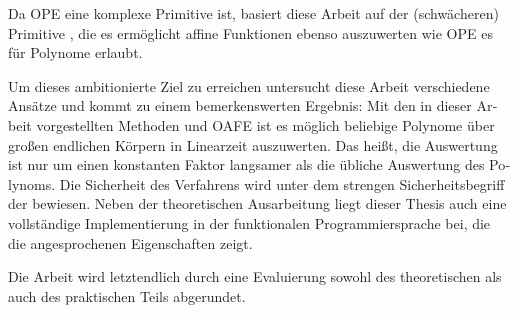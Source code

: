 \begin{otherlanguage}{ngerman}
Da OPE eine komplexe Primitive ist, basiert diese Arbeit auf der
(schwächeren) Primitive , die
es ermöglicht affine Funktionen ebenso auszuwerten wie OPE es für Polynome
erlaubt.

Um dieses ambitionierte Ziel zu erreichen untersucht diese Arbeit verschiedene
Ansätze und kommt zu einem bemerkenswerten Ergebnis: Mit den in dieser Arbeit
vorgestellten Methoden und OAFE ist es möglich beliebige Polynome über großen
endlichen Körpern in Linearzeit auszuwerten. Das heißt, die Auswertung ist nur
um einen konstanten Faktor langsamer als die übliche Auswertung des Polynoms.
Die Sicherheit des Verfahrens wird unter dem strengen Sicherheitsbegriff der
 \cite{canetti05} bewiesen. Neben der
theoretischen Ausarbeitung liegt dieser Thesis auch eine vollständige
Implementierung in der funktionalen Programmiersprache \JWThaskell{} bei, die
die angesprochenen Eigenschaften zeigt.

Die Arbeit wird letztendlich durch eine Evaluierung sowohl des theoretischen als
auch des praktischen Teils abgerundet.

\end{otherlanguage}

\cleardoublepage

